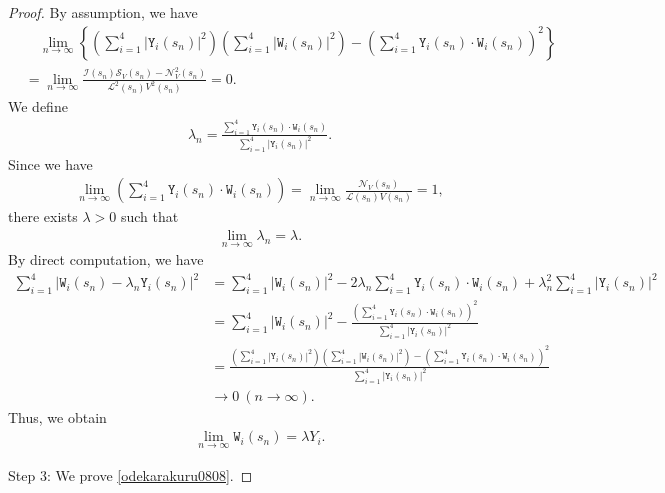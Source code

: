 \documentclass[10pt,a4paper]{amsart}
\numberwithin{equation}{section}
\begin{document}
\begin{proof}
By assumption, we have
\begin{align*}
&\quad \lim_{n\to\infty}\left\{\left(\sum_{i=1}^4\left|\mathtt{Y}_i(s_n)\right|^2\right)\left(\sum_{i=1}^4\left|\mathtt{W}_i(s_n)\right|^2\right)-\left(\sum_{i=1}^4 \mathtt{Y}_i(s_n)\cdot\mathtt{W}_i(s_n)\right)^2\right\}
\\
&=\lim_{n\to\infty}\frac{\mathcal{I}(s_n)\mathcal{S}_V(s_n)-\mathcal{N}_V^2(s_n)}{\mathcal{L}^2(s_n)V^2(s_n)}=0.
\end{align*}
We define
\begin{align*}
\lambda_n=\frac{\sum_{i=1}^4\mathtt{Y}_i(s_n)\cdot \mathtt{W}_i(s_n)}{\sum_{i=1}^4\left|\mathtt{Y}_i(s_n)\right|^2}.
\end{align*}
Since we have
\begin{align*}
\lim_{n\to\infty}\left(\sum_{i=1}^4\mathtt{Y}_i(s_n)\cdot \mathtt{W}_i(s_n)\right)=\lim_{n\to\infty}\frac{\mathcal{N}_V(s_n)}{\mathcal{L}(s_n)V(s_n)}=1,
\end{align*}
there exists $\lambda>0$ such that 
\begin{align*}
\lim_{n\to\infty}\lambda_n=\lambda.
\end{align*}
By direct computation, we have
\begin{align*}
\sum_{i=1}^4\left|\mathtt{W}_i(s_n)-\lambda_n\mathtt{Y}_i(s_n)\right|^2&=\sum_{i=1}^4\left|\mathtt{W}_i(s_n)\right|^2-2\lambda_n\sum_{i=1}^4\mathtt{Y}_i(s_n)\cdot \mathtt{W}_i(s_n)+\lambda_n^2\sum_{i=1}^4\left|\mathtt{Y}_i(s_n)\right|^2
\\
&=\sum_{i=1}^4\left|\mathtt{W}_i(s_n)\right|^2-\frac{\left(\sum_{i=1}^4\mathtt{Y}_i(s_n)\cdot \mathtt{W}_i(s_n)\right)^2}{\sum_{i=1}^4\left|\mathtt{Y}_i(s_n)\right|^2}
\\
&=\frac{\left(\sum_{i=1}^4\left|\mathtt{Y}_i(s_n)\right|^2\right)\left(\sum_{i=1}^4\left|\mathtt{W}_i(s_n)\right|^2\right)-\left(\sum_{i=1}^4 \mathtt{Y}_i(s_n)\cdot\mathtt{W}_i(s_n)\right)^2}{\sum_{i=1}^4\left|\mathtt{Y}_i(s_n)\right|^2}
\\
&\to 0 \ (n\to\infty).
\end{align*}
Thus, we obtain
\begin{align}\label{Whyouka0808}
\lim_{n\to\infty}\mathtt{W}_i(s_n)=\lambda Y_i.
\end{align}


Step 3: We prove \eqref{odekarakuru0808}.


\end{proof}
\end{document}
